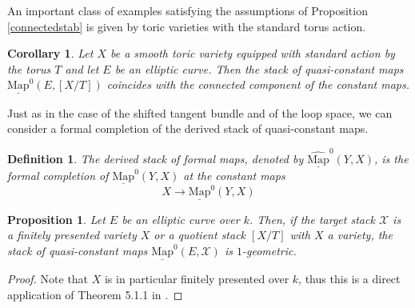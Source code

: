 \documentclass[11pt,letterpaper]{amsart}
\newtheorem{corollary}[dummy]{Corollary}
\newtheorem{proposition}[dummy]{Proposition}
\newtheorem{definition}[dummy]{Definition}
\newcommand{\cX}{\mathcal{X}}
\newcommand{\Mapo}[2]{\underline{\mathrm{Map}}^{0}\left (#1,#2\right )}
\newcommand{\fMapo}[2]{\underline{\widehat{\mathrm{Map}}}^{0}\left (#1,#2\right )}
\begin{document}
An important class of examples satisfying the assumptions of Proposition \ref{connectedstab} is given by toric varieties with the standard torus action. 
\begin{corollary}
Let $X$ be a smooth toric variety equipped with standard action by the torus $T$ and let $E$ be an elliptic curve. Then the stack of quasi-constant maps $\Mapo{E}{[X/T]}$ coincides with the connected component of the constant maps.
\end{corollary}

Just as in the case of the shifted tangent bundle and of the loop space, we can consider a formal completion of the derived stack of quasi-constant maps. 
\begin{definition}
The derived stack of \emph{formal maps}, denoted by $\fMapo{Y}{X}$, is the formal completion of $\Mapo{Y}{X}$ at the constant maps 
$$
X \to \Mapo{Y}{X}
$$
\end{definition}

\begin{proposition}
Let $E$ be an elliptic curve over $k$. Then, if the target stack $\cX$ is a finitely presented variety $X$ or a quotient  stack $[X/T]$ with $X$ a variety, the stack of quasi-constant maps $\Mapo{E}{\cX}$ is $1$-geometric.
\end{proposition}
\begin{proof}
Note that $X$ is in particular finitely presented over $k$, thus this is a direct application of Theorem 5.1.1 in \cite{HLP}. 
\end{proof}
 
 
\end{document}
